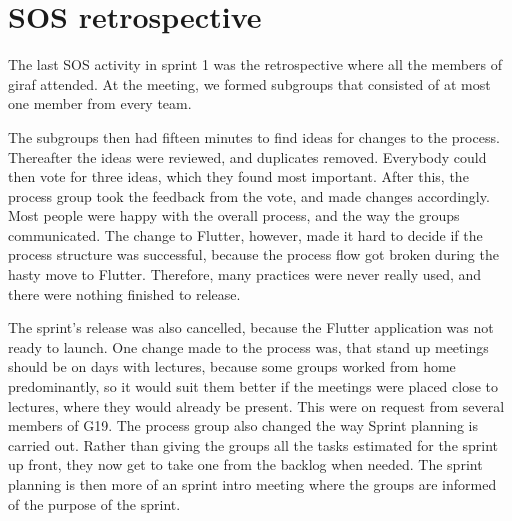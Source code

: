 \section{SOS retrospective}
The last \gls{SOS} activity in sprint 1 was the retrospective where all the members of \gls{giraf} attended. At the meeting, we formed subgroups that consisted of at most one member from every team. 

The subgroups then had fifteen minutes to find ideas for changes to the process. Thereafter the ideas were reviewed, and duplicates removed. Everybody could then vote for three ideas, which they found most important. 
After this, the process group took the feedback from the vote, and made changes accordingly. Most people were happy with the overall process, and the way the groups communicated. 
The change to Flutter, however, made it hard to decide if the process structure was successful, because the process flow got broken during the hasty move to Flutter. Therefore, many practices were never really used, and there were nothing finished to release.

The sprint's release was also cancelled, because the Flutter application was not ready to launch. One change made to the process was, that stand up meetings should be on days with lectures, because some groups worked from home predominantly, so it would suit them better if the meetings were placed close to lectures, where they would already be present.
This were on request from several members of G19. The process group also changed the way Sprint planning is carried out.
Rather than giving the groups all the tasks estimated for the sprint up front, they now get to take one from the backlog when needed. 
The sprint planning is then more of an sprint intro meeting where the groups are informed of the purpose of the sprint. 
